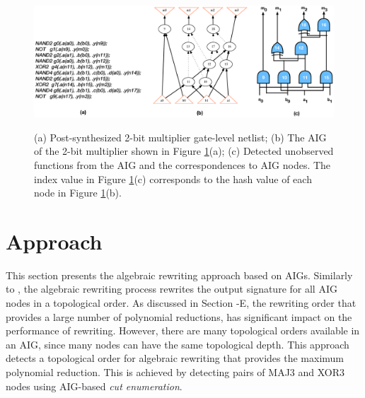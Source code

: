 \begin{figure}[t] 
\begin{center}
\includegraphics[scale=0.25]{../figs/aig-to-gatenetlist.eps}
\caption{(a) Post-synthesized 2-bit multiplier gate-level netlist; (b) The AIG of the 2-bit multiplier shown in Figure \ref{fig:2-bit-mult-aig}(a); (c) Detected unobserved functions from the AIG and the correspondences to AIG nodes. The index value in Figure \ref{fig:2-bit-mult-aig}(c) corresponds to the hash value of each node in Figure \ref{fig:2-bit-mult-aig}(b). }
\vspace{-3mm}
\label{fig:2-bit-mult-aig}
\end{center}
\end{figure}

\section{Approach} \label{sec:approach}

This section presents the algebraic rewriting approach based on AIGs. Similarly to \cite{ciesielski2015verification}, the algebraic rewriting process rewrites the output signature for all AIG nodes in a topological order. As discussed in Section -E, the rewriting order that provides a large number of polynomial reductions, has significant impact on the performance of rewriting. However, there are many topological orders available in an AIG, since many nodes can have the same topological depth. This approach detects a topological order for algebraic rewriting that provides the maximum polynomial reduction. This is achieved by detecting pairs of MAJ3 and XOR3 nodes using AIG-based \textit{cut enumeration}. 

